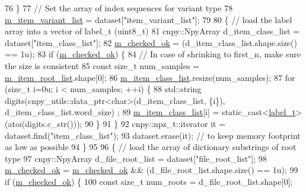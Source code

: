 \begin{DoxyCode}
76   \}
77   \textcolor{comment}{// Set the array of index sequences for variant type}
78   \hyperlink{classlbann_1_1offline__patches__npz_a5aec35e7b2f9956b8e7e8ce5cbb3ff22}{m\_item\_variant\_list} = dataset[\textcolor{stringliteral}{"item\_variant\_list"}];
79 
80   \{ \textcolor{comment}{// load the label array into a vector of label\_t (uint8\_t)}
81     cnpy::NpyArray d\_item\_class\_list = dataset[\textcolor{stringliteral}{"item\_class\_list"}];
82     \hyperlink{classlbann_1_1offline__patches__npz_ab434320c2084790a2c99257d6c39fc85}{m\_checked\_ok} = (d\_item\_class\_list.shape.size() == 1u);
83     \textcolor{keywordflow}{if} (\hyperlink{classlbann_1_1offline__patches__npz_ab434320c2084790a2c99257d6c39fc85}{m\_checked\_ok}) \{
84       \textcolor{comment}{// In case of shrinking to first\_n, make sure the size is consistent}
85       \textcolor{keyword}{const} \textcolor{keywordtype}{size\_t} num\_samples = \hyperlink{classlbann_1_1offline__patches__npz_a5d61c89e80f8e67b4850fb72792ce862}{m\_item\_root\_list}.shape[0];
86       \hyperlink{classlbann_1_1offline__patches__npz_a5f90dc1b898f8ad9d7ea16c188738419}{m\_item\_class\_list}.resize(num\_samples);
87       \textcolor{keywordflow}{for} (\textcolor{keywordtype}{size\_t} i=0u; i < num\_samples; ++i) \{
88         std::string digits(cnpy\_utils::data\_ptr<char>(d\_item\_class\_list, \{i\}), d\_item\_class\_list.word\_size)
      ;
89         \hyperlink{classlbann_1_1offline__patches__npz_a5f90dc1b898f8ad9d7ea16c188738419}{m\_item\_class\_list}[i] = \textcolor{keyword}{static\_cast<}\hyperlink{classlbann_1_1offline__patches__npz_ae0ed6bf62b2be1814964206522ed4e05}{label\_t}\textcolor{keyword}{>}(atoi(digits.c\_str()));
90       \}
91     \}
92     cnpy::npz\_t::iterator it = dataset.find(\textcolor{stringliteral}{"item\_class\_list"});
93     dataset.erase(it); \textcolor{comment}{// to keep memory footprint as low as possible}
94   \}
95 
96   \{ \textcolor{comment}{// load the array of dictionary substrings of root type}
97     cnpy::NpyArray d\_file\_root\_list = dataset[\textcolor{stringliteral}{"file\_root\_list"}];
98     \hyperlink{classlbann_1_1offline__patches__npz_ab434320c2084790a2c99257d6c39fc85}{m\_checked\_ok} = \hyperlink{classlbann_1_1offline__patches__npz_ab434320c2084790a2c99257d6c39fc85}{m\_checked\_ok} && (d\_file\_root\_list.shape.size() == 1u);
99     \textcolor{keywordflow}{if} (\hyperlink{classlbann_1_1offline__patches__npz_ab434320c2084790a2c99257d6c39fc85}{m\_checked\_ok}) \{
100       \textcolor{keyword}{const} \textcolor{keywordtype}{size\_t} num\_roots = d\_file\_root\_list.shape[0];

\end{DoxyCode}
